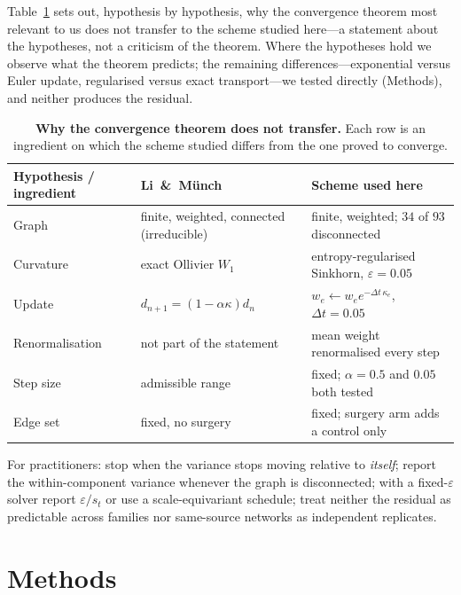\documentclass[11pt]{article}
\begin{document}
Table~\ref{tab:assumptions} sets out, hypothesis by hypothesis, why the
convergence theorem most relevant to us does not transfer to the scheme studied
here---a statement about the hypotheses, not a criticism of the theorem. Where
the hypotheses hold we observe what the theorem predicts; the remaining
differences---exponential versus Euler update, regularised versus exact
transport---we tested directly (Methods), and neither produces the residual.

\begin{table}[t]
\centering
\begin{tabular}{p{2.6cm}p{3.0cm}p{3.0cm}}
\toprule
Hypothesis / ingredient & Li~\&~M\"unch \cite{LiMunch2026} & Scheme used here \\
\midrule
Graph & finite, weighted, connected (irreducible) & finite, weighted; $34$ of $93$ disconnected \\
Curvature & exact {Ollivier} $W_1$ & entropy-regularised {Sinkhorn}, $\varepsilon=0.05$ \\
Update & $d_{n+1}=(1-\alpha\kappa)d_n$ & $w_e\leftarrow w_e e^{-\Delta t\,\kappa_e}$, $\Delta t=0.05$ \\
Renormalisation & not part of the statement & mean weight renormalised every step \\
Step size & admissible range & fixed; $\alpha=0.5$ and $0.05$ both tested \\
Edge set & fixed, no surgery & fixed; surgery arm adds a control only \\
\bottomrule
\end{tabular}
\caption{\textbf{Why the convergence theorem does not transfer.} Each row is an
ingredient on which the scheme studied differs from the one proved to
converge.}
\label{tab:assumptions}
\end{table}

For practitioners: stop when the variance stops moving relative to
\emph{itself}; report the within-component variance whenever the graph is
disconnected; with a fixed-$\varepsilon$ solver report $\varepsilon/s_t$ or use
a scale-equivariant schedule; treat neither the residual as predictable across
families nor same-source networks as independent replicates.
\section*{Methods}
\end{document}
